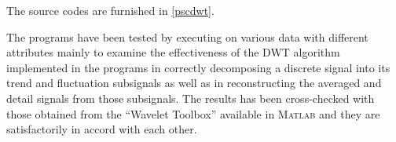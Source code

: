 \documentclass[a4paper,11pt]{report}
\begin{document}
The source codes are furnished in \ref{pscdwt}.

The programs have been tested by executing on various data with different attributes mainly to examine the effectiveness of the DWT algorithm implemented in the programs in correctly decomposing a discrete signal into its trend and fluctuation subsignals as well as in reconstructing the averaged and detail signals from those subsignals. The results has been cross-checked with those obtained from the ``Wavelet Toolbox'' available in \textsc{Matlab} and they are satisfactorily in accord with each other.





\end{document}
